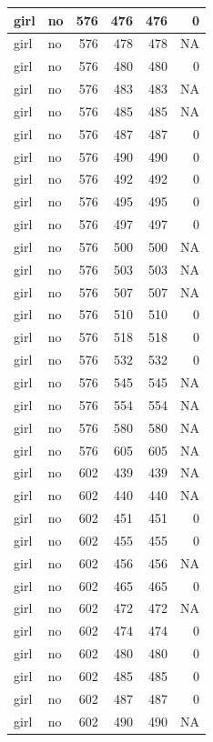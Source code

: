 \documentclass[man]{apa6}
\begin{document}
\begin{tabular}{l|l|r|r|r|r}
\hline
girl & no & 576 & 476 & 476 & 0\\
\hline
girl & no & 576 & 478 & 478 & NA\\
\hline
girl & no & 576 & 480 & 480 & 0\\
\hline
girl & no & 576 & 483 & 483 & NA\\
\hline
girl & no & 576 & 485 & 485 & NA\\
\hline
girl & no & 576 & 487 & 487 & 0\\
\hline
girl & no & 576 & 490 & 490 & 0\\
\hline
girl & no & 576 & 492 & 492 & 0\\
\hline
girl & no & 576 & 495 & 495 & 0\\
\hline
girl & no & 576 & 497 & 497 & 0\\
\hline
girl & no & 576 & 500 & 500 & NA\\
\hline
girl & no & 576 & 503 & 503 & NA\\
\hline
girl & no & 576 & 507 & 507 & NA\\
\hline
girl & no & 576 & 510 & 510 & 0\\
\hline
girl & no & 576 & 518 & 518 & 0\\
\hline
girl & no & 576 & 532 & 532 & 0\\
\hline
girl & no & 576 & 545 & 545 & NA\\
\hline
girl & no & 576 & 554 & 554 & NA\\
\hline
girl & no & 576 & 580 & 580 & NA\\
\hline
girl & no & 576 & 605 & 605 & NA\\
\hline
girl & no & 602 & 439 & 439 & NA\\
\hline
girl & no & 602 & 440 & 440 & NA\\
\hline
girl & no & 602 & 451 & 451 & 0\\
\hline
girl & no & 602 & 455 & 455 & 0\\
\hline
girl & no & 602 & 456 & 456 & NA\\
\hline
girl & no & 602 & 465 & 465 & 0\\
\hline
girl & no & 602 & 472 & 472 & NA\\
\hline
girl & no & 602 & 474 & 474 & 0\\
\hline
girl & no & 602 & 480 & 480 & 0\\
\hline
girl & no & 602 & 485 & 485 & 0\\
\hline
girl & no & 602 & 487 & 487 & 0\\
\hline
girl & no & 602 & 490 & 490 & NA\\

\end{tabular}
\end{document}
